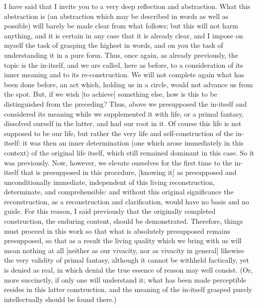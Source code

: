 I have said that I invite you to
a very deep reflection and abstraction.
What this abstraction is
(an abstraction which may be described
in words as well as possible)
will barely be made clear from what follows;
but this will not harm anything,
and it is certain in any case that it is already clear,
and I impose on myself the task of grasping the highest in words,
and on you the task of understanding it in a pure form.
Thus, once again, as already previously,
the topic is the in-itself,
and we are called, here as before, to
a consideration of its inner meaning
and to its re-construction.
We will not complete again what has been done before,
an act which, holding us in a circle,
would not advance us from the spot.
But, if we wish [to achieve] something else,
how is this to be distinguished from the preceding?
Thus, above we presupposed the in-itself
and considered its meaning while we supplemented it with life,
or a primal fantasy, dissolved ourself in the latter,
and had our root in it.
Of course this life is not supposed to be our life,
but rather the very life and self-construction of the in-itself:
it was then an inner determination
(one which arose immediately in this context)
of the original life itself,
which still remained dominant in this case.
So it was previously.
Now, however, we elevate ourselves for the first time to
the in-itself that is presupposed in this procedure,
[knowing it] as presupposed and unconditionally immediate,
independent of this living reconstruction,
determinate, and comprehensible:
and without this original significance the reconstruction,
as a reconstruction and clarification,
would have no basis and no guide.
For this reason, I said previously that
the originally completed construction,
the enduring content, should be demonstrated.
Therefore, things must proceed in this work
so that what is absolutely presupposed remains presupposed,
so that as a result the living quality
which we bring with us will mean nothing at all
[neither as our vivacity, nor as vivacity in general]
likewise the very validity of primal fantasy,
although it cannot be withheld factically,
yet is denied as real, in which denial
the true essence of reason may well consist.
(Or, more succinctly, if only one will understand it;
what has been made perceptible resides
in this latter construction,
and the meaning of the in-itself
grasped purely intellectually
should be found there.)

